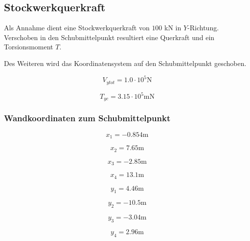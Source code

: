 \documentclass[
  letterpaper,
  DIV=11]{scrreprt}
\begin{document}
\hypertarget{stockwerkquerkraft}{%
\subsection{Stockwerkquerkraft}\label{stockwerkquerkraft}}

Als Annahme dient eine Stockwerkquerkraft von \(100\) kN in
\(Y\)-Richtung. Verschoben in den Schubmittelpunkt resultiert eine
Querkraft und ein Torsionsmoment \(T\).

Des Weiteren wird das Koordinatensystem auf den Schubmittelpunkt
geschoben.

\begin{equation*}V_{y tot} = 1.0 \cdot 10^{5} \text{N}\end{equation*}

\begin{equation*}T_{yc} = 3.15 \cdot 10^{5} \text{m} \text{N}\end{equation*}

\hypertarget{wandkoordinaten-zum-schubmittelpunkt}{%
\subsubsection{Wandkoordinaten zum
Schubmittelpunkt}\label{wandkoordinaten-zum-schubmittelpunkt}}

\begin{equation*}x_{1} = - 0.854 \text{m}\end{equation*}

\begin{equation*}x_{2} = 7.65 \text{m}\end{equation*}

\begin{equation*}x_{3} = - 2.85 \text{m}\end{equation*}

\begin{equation*}x_{4} = 13.1 \text{m}\end{equation*}

\begin{equation*}y_{1} = 4.46 \text{m}\end{equation*}

\begin{equation*}y_{2} = - 10.5 \text{m}\end{equation*}

\begin{equation*}y_{3} = - 3.04 \text{m}\end{equation*}

\begin{equation*}y_{4} = 2.96 \text{m}\end{equation*}
\end{document}
